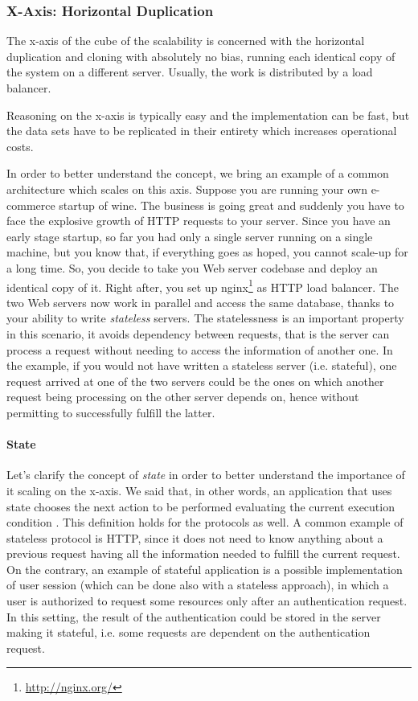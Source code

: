 \subsubsection{X-Axis: Horizontal Duplication}

The x-axis of the cube of the scalability is concerned with the horizontal
duplication and cloning with absolutely no bias, running each identical copy of
the system on a different server. Usually, the work is distributed by a load
balancer.

Reasoning on the x-axis is typically easy and the implementation can be fast,
but the data sets have to be replicated in their entirety which increases
operational costs.

In order to better understand the concept, we bring an example of a common
architecture which scales on this axis. Suppose you are running your own
e-commerce startup of wine. The business is going great and suddenly you have to
face the explosive growth of HTTP requests to your server. Since you have an
early stage startup, so far you had only a single server running on a single
machine, but you know that, if everything goes as hoped, you cannot scale-up for
a long time. So, you decide to take you Web server codebase and deploy an
identical copy of it. Right after, you set up
nginx\footnote{\url{http://nginx.org/}} as HTTP load balancer. The two Web
servers now work in parallel and access the same database, thanks to your
ability to write \emph{stateless} servers. The statelessness is an important
property in this scenario, it avoids dependency between requests, that is
the server can process a request without needing to access the information of
another one. In the example, if you would not have written a stateless server
(i.e. stateful), one request arrived at one of the two servers could be the ones
on which another request being processing on the other server depends on, hence
without permitting to successfully fulfill the latter.

\paragraph{State}
Let's clarify the concept of \emph{state} in order to better understand the
importance of it scaling on the x-axis. We said that, in other words, an
application that uses state chooses the next action to be performed evaluating
the current execution condition \cite{bib:art-of-scalability}. This definition
holds for the protocols as well. A common example of stateless protocol is HTTP,
since it does not need to know anything about a previous request having all the
information needed to fulfill the current request. On the contrary, an example
of stateful application is a possible implementation of user session (which can
be done also with a stateless approach), in which a user is authorized to
request some resources only after an authentication request. In this setting,
the result of the authentication could be stored in the server making it
stateful, i.e. some requests are dependent on the authentication request.


